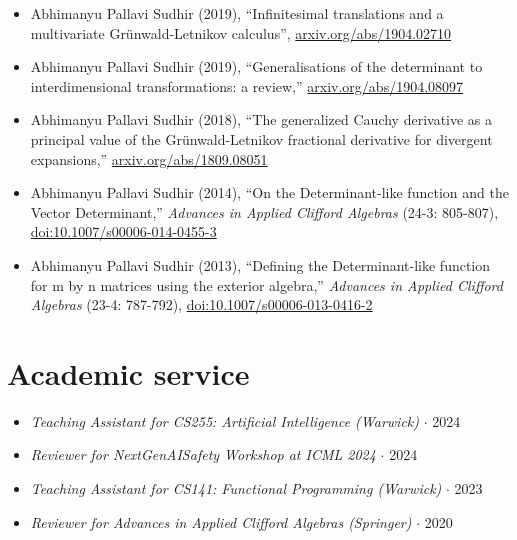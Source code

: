 \documentclass{article}
\begin{document}
\begin{itemize}

    \item
          Abhimanyu Pallavi Sudhir (2019),
          ``Infinitesimal translations and a multivariate Gr\"unwald-Letnikov calculus'', \href{https://arxiv.org/abs/1904.02710}{arxiv.org/abs/1904.02710}

    \item
          Abhimanyu Pallavi Sudhir (2019),
          ``Generalisations of the determinant to interdimensional transformations: a review,'' \href{https://arxiv.org/abs/1904.08097}{arxiv.org/abs/1904.08097}

    \item
          Abhimanyu Pallavi Sudhir (2018),
          ``The generalized Cauchy derivative as a principal value of the Gr\"unwald-Letnikov fractional derivative for divergent expansions,'' \href{https://arxiv.org/abs/1809.08051}{arxiv.org/abs/1809.08051}

    \item
          Abhimanyu Pallavi Sudhir (2014),
          ``On the Determinant-like function and the Vector Determinant,''
          \emph{Advances in Applied Clifford Algebras} (24-3: 805-807), \href{https://link.springer.com/article/10.1007/s00006-014-0455-3}{doi:10.1007/s00006-014-0455-3}

    \item
          Abhimanyu Pallavi Sudhir (2013),
          ``Defining the Determinant-like function for m by n matrices using the exterior algebra,''
          \emph{Advances in Applied Clifford Algebras} (23-4: 787-792),
          \href{https://link.springer.com/article/10.1007/s00006-013-0416-2}{doi:10.1007/s00006-013-0416-2}

\end{itemize}

\section*{Academic service}

\begin{itemize}

    \item \emph{Teaching Assistant for CS255: Artificial Intelligence (Warwick)} $\cdot$ 2024

    \item \emph{Reviewer for NextGenAISafety Workshop at ICML 2024} $\cdot$ 2024

    \item \emph{Teaching Assistant for CS141: Functional Programming (Warwick)} $\cdot$ 2023

    \item \emph{Reviewer for Advances in Applied Clifford Algebras (Springer)} $\cdot$ 2020

\end{itemize}
\end{document}
